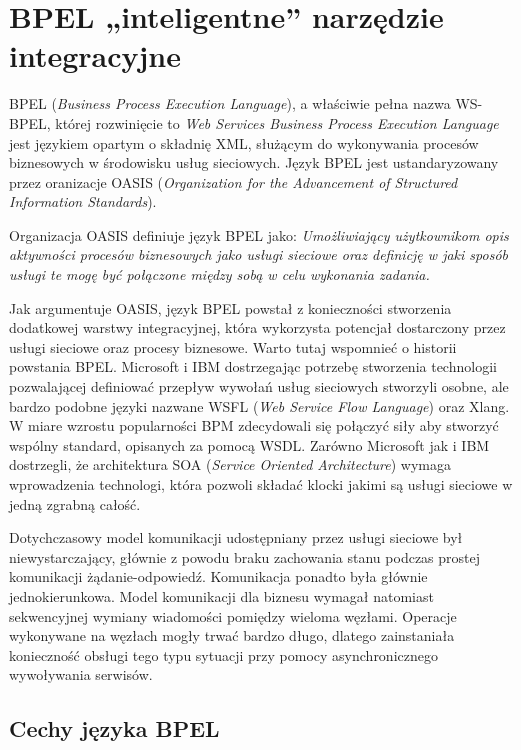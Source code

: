 \chapter{BPEL „inteligentne” narzędzie integracyjne}
\label{cha:bpel}

BPEL (\textit{Business Process Execution Language}), a właściwie pełna nazwa WS-BPEL,  której rozwinięcie to \textit{Web Services Business Process Execution Language} jest językiem opartym o składnię XML, służącym do wykonywania procesów biznesowych w środowisku usług sieciowych. Język BPEL jest ustandaryzowany przez oranizacje OASIS (\textit{Organization for the Advancement of Structured Information Standards}). 

Organizacja OASIS definiuje język BPEL jako: \textit{Umożliwiający użytkownikom opis aktywności procesów biznesowych jako usługi sieciowe oraz definicję w jaki sposób usługi te mogę być połączone między sobą w celu wykonania zadania.} ~\cite{OASISweb}

Jak argumentuje OASIS, język BPEL powstał z konieczności stworzenia dodatkowej warstwy integracyjnej, która wykorzysta potencjał dostarczony przez usługi sieciowe oraz procesy biznesowe. Warto tutaj wspomnieć o historii powstania BPEL. Microsoft i IBM dostrzegając potrzebę stworzenia technologii pozwalającej definiować przepływ wywołań usług sieciowych stworzyli osobne, ale bardzo podobne języki nazwane WSFL (\textit{Web Service Flow Language}) oraz Xlang. W miare wzrostu popularności BPM zdecydowali się połączyć siły aby stworzyć wspólny standard, opisanych za pomocą WSDL. Zarówno Microsoft jak i IBM dostrzegli, że architektura SOA (\textit{Service Oriented Architecture}) wymaga wprowadzenia technologi, która pozwoli składać klocki jakimi są usługi sieciowe w jedną zgrabną całość.

Dotychczasowy model komunikacji udostępniany przez usługi sieciowe był niewystarczający, głównie z powodu braku zachowania stanu podczas prostej komunikacji żądanie-odpowiedź.  Komunikacja ponadto była głównie jednokierunkowa. Model komunikacji dla biznesu wymagał natomiast sekwencyjnej wymiany wiadomości pomiędzy wieloma węzłami. Operacje wykonywane na węzłach mogły trwać bardzo długo, dlatego zainstaniała konieczność obsługi tego typu sytuacji przy pomocy asynchronicznego wywoływania serwisów. ~\cite{OASISBPELSpec}


\section{Cechy języka BPEL}
\label{sec:bpelFeatures}

